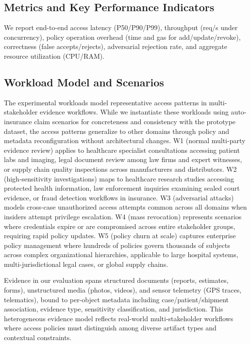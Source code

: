 \documentclass[pdflatex,sn-mathphys-num]{sn-jnl}
\begin{document}
\subsection{Metrics and Key Performance Indicators}

We report end-to-end access latency (P50/P90/P99), throughput (req/s under concurrency), policy operation overhead (time and gas for add/update/revoke), correctness (false accepts/rejects), adversarial rejection rate, and aggregate resource utilization (CPU/RAM).

\subsection{Workload Model and Scenarios}

The experimental workloads model representative access patterns in multi-stakeholder evidence workflows. While we instantiate these workloads using auto-insurance claim scenarios for concreteness and consistency with the prototype dataset, the access patterns generalize to other domains through policy and metadata reconfiguration without architectural changes. W1 (normal multi-party evidence review) applies to healthcare specialist consultations accessing patient labs and imaging, legal document review among law firms and expert witnesses, or supply chain quality inspections across manufacturers and distributors. W2 (high-sensitivity investigations) maps to healthcare research studies accessing protected health information, law enforcement inquiries examining sealed court evidence, or fraud detection workflows in insurance. W3 (adversarial attacks) models cross-case unauthorized access attempts common across all domains when insiders attempt privilege escalation. W4 (mass revocation) represents scenarios where credentials expire or are compromised across entire stakeholder groups, requiring rapid policy updates. W5 (policy churn at scale) captures enterprise policy management where hundreds of policies govern thousands of subjects across complex organizational hierarchies, applicable to large hospital systems, multi-jurisdictional legal cases, or global supply chains.

Evidence in our evaluation spans structured documents (reports, estimates, forms), unstructured media (photos, videos), and sensor telemetry (GPS traces, telematics), bound to per-object metadata including case/patient/shipment association, evidence type, sensitivity classification, and jurisdiction. This heterogeneous evidence model reflects real-world multi-stakeholder workflows where access policies must distinguish among diverse artifact types and contextual constraints.
\end{document}
